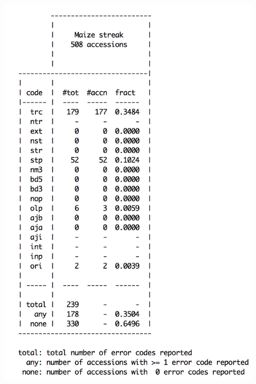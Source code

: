 \documentclass[landscape]{slides}
\begin{document}
\begin{slide}
\begin{center}
\includegraphics[height=8in]{figs/pilot-errcode-table-1}
\vfill
\end{center}
\end{slide}
\end{document}
